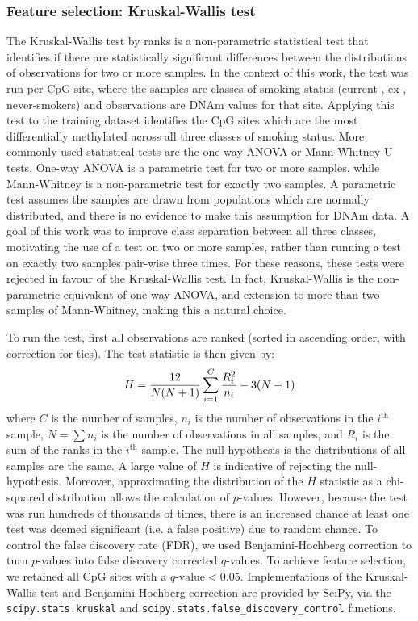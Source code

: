 \documentclass[draft]{article} %
\newcommand{\equationname}[1]{%
    \begingroup
        \leavevmode
        \addcontentsline{equ}{equations}{\protect\numberline{\theequation}#1}%
    \endgroup   
}
\begin{document}
\subsubsection{Feature selection: Kruskal-Wallis test} \label{sec:feature-selection}
The Kruskal-Wallis test by ranks \cite{Kruskal1952UseOR} is a non-parametric statistical test that identifies if there are statistically significant differences between the distributions of observations for two or more samples. In the context of this work, the test was run per CpG site, where the samples are classes of smoking status (current-, ex-, never-smokers) and observations are DNAm values for that site. Applying this test to the training dataset identifies the CpG sites which are the most differentially methylated across all three classes of smoking status. More commonly used statistical tests are the one-way ANOVA \cite{fisher1921probable} or Mann-Whitney U \cite{mann1947test} tests. One-way ANOVA is a parametric test for two or more samples, while Mann-Whitney is a non-parametric test for exactly two samples. A parametric test assumes the samples are drawn from populations which are normally distributed, and there is no evidence to make this assumption for DNAm data. A goal of this work was to improve class separation between all three classes, motivating the use of a test on two or more samples, rather than running a test on exactly two samples pair-wise three times. For these reasons, these tests were rejected in favour of the Kruskal-Wallis test. In fact, Kruskal-Wallis is the non-parametric equivalent of one-way ANOVA, and extension to more than two samples of Mann-Whitney, making this a natural choice.

To run the test, first all observations are ranked (sorted in ascending order, with correction for ties). The test statistic is then given by:
\begin{equation} \equationname{Kruskal-Wallis test by ranks}
    H = \frac{12}{N(N + 1)}\sum_{i=1}^{C}\frac{R_i^2}{n_i} - 3(N + 1)
\end{equation}
where \(C\) is the number of samples, \(n_i\) is the number of observations in the \(i^\text{th}\) sample, \(N = \sum n_i\) is the number of observations in all samples, and \(R_i\) is the sum of the ranks in the \(i^\text{th}\) sample. The null-hypothesis is the distributions of all samples are the same. A large value of \(H\) is indicative of rejecting the null-hypothesis. Moreover, approximating the distribution of the \(H\) statistic as a chi-squared distribution allows the calculation of \(p\)-values. However, because the test was run hundreds of thousands of times, there is an increased chance at least one test was deemed significant (i.e. a false positive) due to random chance. To control the false discovery rate (FDR), we used Benjamini-Hochberg correction \cite{benjamini1995controlling} to turn \(p\)-values into false discovery corrected \(q\)-values. To achieve feature selection, we retained all CpG sites with a \(q\text{-value} < 0.05\). Implementations of the Kruskal-Wallis test and Benjamini-Hochberg correction are provided by SciPy, via the \verb|scipy.stats.kruskal| and \verb|scipy.stats.false_discovery_control| functions.
\end{document}
